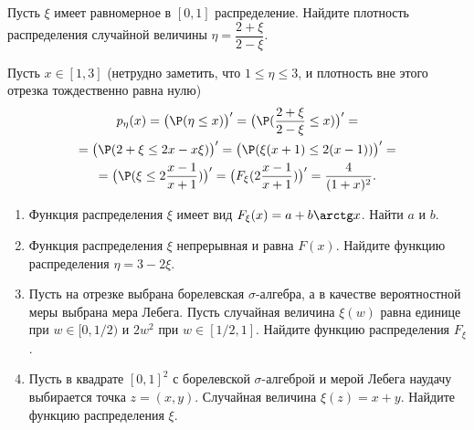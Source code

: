 \begin{problem}
    Пусть $\xi$ имеет равномерное в $[0, 1]$ распределение.
    Найдите плотность распределения случайной величины $\eta = \dfrac{2 + \xi}{2 - \xi}$.
\end{problem}
\begin{solution}
    Пусть $x \in [1, 3]$ (нетрудно заметить, что $1 \leq \eta \leq 3$, и плотность вне этого отрезка тождественно равна нулю)
    \begin{multline*}
        p_{\eta}(x) = \big(\P(\eta \leq x)\big)' = \big(\P(\dfrac{2 + \xi}{2 - \xi} \leq x)\big)' = \\ =
        \big(\P(2 + \xi \leq 2x - x\xi)\big)' = \big(\P(\xi(x + 1) \leq 2(x - 1))\big)' = \\ = \big(\P(\xi \leq 2\dfrac{x - 1}{x + 1})\big)'  =
        \big(F_\xi(2\dfrac{x - 1}{x + 1})\big)' = \dfrac{4}{(1 + x)^2}.
    \end{multline*}
\end{solution}
\begin{problem} \leavevmode
    \begin{enumerate}
        \item Функция распределения $\xi$ имеет вид $F_\xi(x) = a + b \arctg x$. Найти $a$ и $b$.
        \item Функция распределения $\xi$ непрерывная и равна $F(x)$. Найдите функцию распределения $\eta = 3 - 2\xi$.
        \item Пусть на отрезке выбрана борелевская $\sigma$-алгебра, а в качестве вероятностной меры выбрана мера Лебега. Пусть случайная величина $\xi(w)$ равна единице при $w \in [0, 1/2)$ и $2w^2$ при $w \in [1/2, 1]$. Найдите функцию распределения $F_{\xi}$.
        \item Пусть в квадрате $[0, 1]^2$ с борелевской $\sigma$-алгеброй и мерой Лебега наудачу выбирается точка $z = (x, y)$. Случайная величина $\xi(z) = x + y$. Найдите функцию распределения $\xi$.
    \end{enumerate}
\end{problem}
